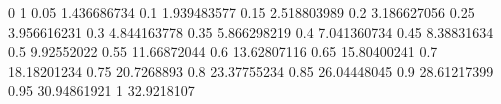 0	1
0.05	1.436686734
0.1	1.939483577
0.15	2.518803989
0.2	3.186627056
0.25	3.956616231
0.3	4.844163778
0.35	5.866298219
0.4	7.041360734
0.45	8.38831634
0.5	9.92552022
0.55	11.66872044
0.6	13.62807116
0.65	15.80400241
0.7	18.18201234
0.75	20.7268893
0.8	23.37755234
0.85	26.04448045
0.9	28.61217399
0.95	30.94861921
1	32.9218107



